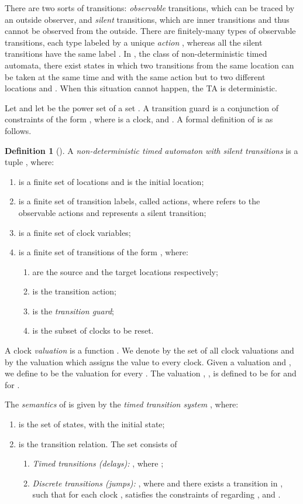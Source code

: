 \documentclass[11pt]{amsart}
\theoremstyle{definition}
\newtheorem{definition}[theorem]{Definition}
\begin{document}
There are two sorts of transitions: \emph{observable} transitions, which can be traced by an outside observer, and \emph{silent} transitions, which are inner transitions and thus cannot be observed from the outside.
There are finitely-many types of observable transitions, each type labeled by a unique \emph{action} , whereas all the silent transitions have the same label .
In , the class of non-deterministic timed automata, there exist states in which two transitions from the same location  can be taken at the same time and with the same action but to two different locations  and .
When this situation cannot happen, the TA is deterministic.


Let  and let  be the power set of a set .
A transition guard is a conjunction of constraints of the form , where  is a clock,  and .
A formal definition of  is as follows.
\begin{definition}[]
\label{def:ntaeps}
A \emph{non-deterministic timed automaton with silent transitions}  is a tuple , where:
\begin{enumerate}
\item  is a finite set of locations and  is the initial location;
\item  is a finite set of transition labels, called actions, where  refers to the observable actions and  represents a silent transition;
\item  is a finite set of clock variables;
\item  is a finite set of transitions of the form , where:
\begin{enumerate}
\item  are the source and the target locations respectively;
\item  is the transition action;
\item  is the \emph{transition guard};
\item  is the subset of clocks to be reset.
\end{enumerate}
\end{enumerate}
\end{definition}

A clock \emph{valuation}  is a function . 
We denote by  the set of all clock valuations and by
 the valuation which assigns the value  to every clock.
Given a valuation  and , we define  to be the valuation  for every .
The valuation , , is defined to be  for  and  for .

The \emph{semantics} of  is given by the \emph{timed transition system}
, where:
\begin{enumerate}
\item  is the set of states, with
 the initial state;
\item  is the transition relation.
The set  consists of
\begin{enumerate}
\item \emph{Timed transitions (delays):} , where ;
\item \emph{Discrete transitions (jumps):} , where  and there exists a transition  in , such that for each clock ,  satisfies the constraints of  regarding , and .
\end{enumerate}
\end{enumerate}
\end{document}

